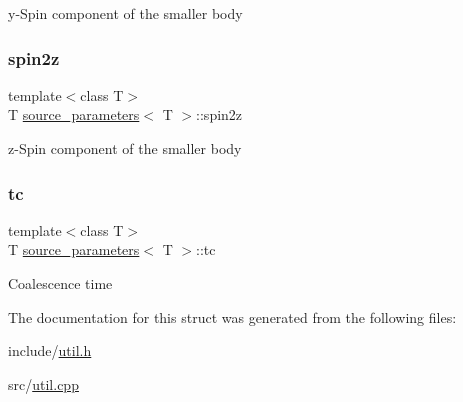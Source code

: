 y-\/\+Spin component of the smaller body \mbox{\label{structsource__parameters_a1dfb782bc530dd8bc64a8a454da4e698}} 
\subsubsection{\texorpdfstring{spin2z}{spin2z}}
{\footnotesize\ttfamily template$<$class T$>$ \\
T \hyperlink{structsource__parameters}{source\+\_\+parameters}$<$ T $>$\+::spin2z}

z-\/\+Spin component of the smaller body \mbox{\label{structsource__parameters_ac0c03ead9615b4c9f27d160ad023db70}} 
\subsubsection{\texorpdfstring{tc}{tc}}
{\footnotesize\ttfamily template$<$class T$>$ \\
T \hyperlink{structsource__parameters}{source\+\_\+parameters}$<$ T $>$\+::tc}

Coalescence time 

The documentation for this struct was generated from the following files\+:\begin{DoxyCompactItemize}
\item 
include/\hyperlink{util_8h}{util.\+h}\item 
src/\hyperlink{util_8cpp}{util.\+cpp}\end{DoxyCompactItemize}
